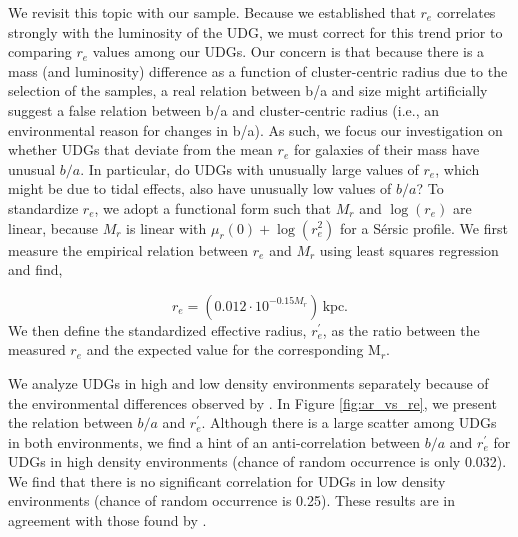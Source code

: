 \documentclass[twocolumn,tighten]{aastex63}
\begin{document}
We revisit this topic with our sample. Because we established that $r_e$ correlates strongly with the luminosity of the UDG, we must correct for this trend prior to comparing $r_e$ values among our UDGs.
Our concern is that because there is a mass (and luminosity) difference as a function of cluster-centric radius due to the selection of the samples,  a real relation between b/a and size might artificially suggest a false relation between b/a and cluster-centric radius (i.e., an environmental reason for changes in b/a). As such, we focus our investigation on whether UDGs that deviate from the mean $r_e$ for galaxies of their mass have unusual $b/a$. In particular, do UDGs with unusually large values of $r_e$, which might be due to tidal effects, also have unusually low values of $b/a$?
To standardize $r_e$, we adopt a functional form such that $M_r$ and $\log(r_e)$ are linear, because $M_r$ is linear with $\mu_r(0) + \log(r_e^2)$ for a S\'ersic profile.
We first measure the empirical relation between $r_e$ and $M_r$ using least squares regression and find,

\begin{equation}
r_e = \left(0.012 \cdot 10^{-0.15 M_r} \right) \, \mathrm{kpc}.
\end{equation}
\noindent
We then define the standardized effective radius, $r^\prime_e$, as the ratio between the measured $r_e$ and the expected value for the corresponding $\mathrm{M}_r$.  

We analyze UDGs in high and low density environments separately because of the environmental differences observed by \cite{Pina2019}.
In Figure \ref{fig:ar_vs_re}, we present the relation between $b/a$ and $r^\prime_e$.
Although there is a large scatter among UDGs in both environments, 
we find a hint of an anti-correlation between $b/a$ and $r^\prime_e$ for UDGs in high density environments (chance of random occurrence is only 0.032).
We find that there is no significant correlation for UDGs in low density environments (chance of random occurrence is 0.25).
These results are in agreement with those found by \cite{Pina2019}.
\end{document}
